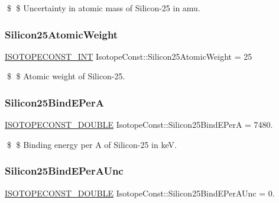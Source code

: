 \$ \$ Uncertainty in atomic mass of Silicon-\/25 in amu. \mbox{\label{group___isotope_const-_silicon-_si25_gae147fd03fc867b11c74f2577dd385294}} 
\subsubsection{\texorpdfstring{Silicon25\+Atomic\+Weight}{Silicon25AtomicWeight}}
{\footnotesize\ttfamily \mbox{\hyperlink{group___isotope_const-_macros_ga5f18360b3e99483a35c32d789e62621c}{I\+S\+O\+T\+O\+P\+E\+C\+O\+N\+S\+T\+\_\+\+I\+NT}} Isotope\+Const\+::\+Silicon25\+Atomic\+Weight = 25}

\$ \$ Atomic weight of Silicon-\/25. \mbox{\label{group___isotope_const-_silicon-_si25_ga49c7abccbf3d6708670c7201ecedfaae}} 
\subsubsection{\texorpdfstring{Silicon25\+Bind\+E\+PerA}{Silicon25BindEPerA}}
{\footnotesize\ttfamily \mbox{\hyperlink{group___isotope_const-_macros_ga8f45a7272ce02c0b4c65c44636ed719a}{I\+S\+O\+T\+O\+P\+E\+C\+O\+N\+S\+T\+\_\+\+D\+O\+U\+B\+LE}} Isotope\+Const\+::\+Silicon25\+Bind\+E\+PerA = 7480.}

\$ \$ Binding energy per A of Silicon-\/25 in keV. \mbox{\label{group___isotope_const-_silicon-_si25_ga9884e0690fcdbba745aae21e552a7054}} 
\subsubsection{\texorpdfstring{Silicon25\+Bind\+E\+Per\+A\+Unc}{Silicon25BindEPerAUnc}}
{\footnotesize\ttfamily \mbox{\hyperlink{group___isotope_const-_macros_ga8f45a7272ce02c0b4c65c44636ed719a}{I\+S\+O\+T\+O\+P\+E\+C\+O\+N\+S\+T\+\_\+\+D\+O\+U\+B\+LE}} Isotope\+Const\+::\+Silicon25\+Bind\+E\+Per\+A\+Unc = 0.}

